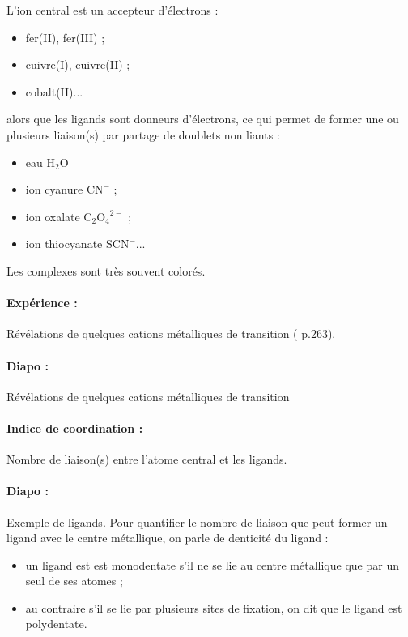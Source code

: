 L'ion central est un accepteur d'électrons :
\begin{itemize}
\item fer(II), fer(III) ;
\item cuivre(I), cuivre(II) ;
\item cobalt(II)...
\end{itemize}
alors que les ligands sont donneurs d'électrons, ce qui permet de former une ou plusieurs liaison(s) par partage de doublets non liants :
\begin{itemize}
\item eau $\mathrm{H_2O}$
\item ion cyanure $\mathrm{CN}^-$ ;
\item ion oxalate $\mathrm{C_2O_4}^{2-}$ ;
\item ion thiocyanate $\mathrm{SCN^-}$...
\end{itemize}
Les complexes sont très souvent colorés.

\paragraph{Expérience :} Révélations de quelques cations métalliques de transition (\cite{Buchere2017} p.263).

\paragraph{Diapo :} Révélations de quelques cations métalliques de transition

\paragraph{Indice de coordination : } Nombre de liaison(s) entre l'atome central et les ligands.

\paragraph{Diapo :} Exemple de ligands.
Pour quantifier le nombre de liaison que peut former un ligand avec le centre métallique, on parle de denticité du ligand :
\begin{itemize}
\item un ligand est est monodentate s'il ne se lie au centre métallique que par un seul de ses atomes ;
\item au contraire s'il se lie par plusieurs sites de fixation, on dit que le ligand est polydentate.
\end{itemize}

